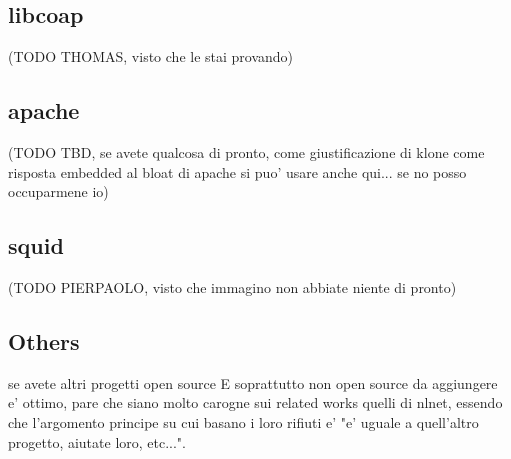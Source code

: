 \subsection{libcoap}

(TODO THOMAS, visto che le stai provando)

\subsection{apache}

(TODO TBD, se avete qualcosa di pronto, come giustificazione di klone come risposta embedded al bloat di apache si puo' usare anche qui... se no posso occuparmene io)

\subsection{squid}

(TODO PIERPAOLO, visto che immagino non abbiate niente di pronto)

\subsection{Others}

se avete altri progetti open source E soprattutto non open source da aggiungere e' ottimo, pare che siano molto carogne sui related works quelli di nlnet, essendo che l'argomento principe su cui basano i loro rifiuti e' "e' uguale a quell'altro progetto, aiutate loro, etc...". 
